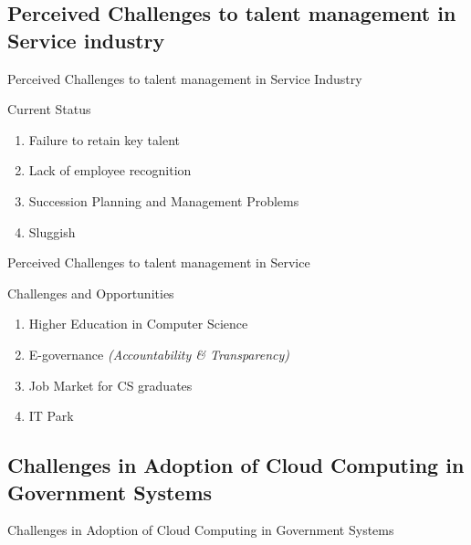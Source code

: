 \subsection{Perceived Challenges to talent management in Service industry}

\begin{frame}{{Perceived Challenges to talent management in Service Industry}}
    \begin{exampleblock}
        {Current Status}
        \begin{enumerate}
            \item Failure to retain key talent
            \item Lack of employee recognition
            \item Succession Planning and Management Problems
            \item Sluggish
        \end{enumerate}
    \end{exampleblock}
\end{frame}
\begin{frame}{Perceived Challenges to talent management in Service}
    \begin{alertblock}
        {Challenges and Opportunities}
        \begin{enumerate}
            \item Higher Education in Computer Science
            \item E-governance \textit{(Accountability \& Transparency)}
            \item Job Market for CS graduates
            \item IT Park
        \end{enumerate}
    \end{alertblock}
\end{frame}

\subsection{Challenges in Adoption of Cloud Computing in Government Systems}

\begin{frame}{Challenges in Adoption of Cloud Computing in Government Systems}
    
\end{frame}


